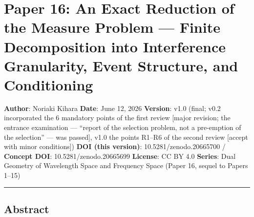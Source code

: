 \documentclass[
]{article}
\author{}
\date{}
\begin{document}
\section{Paper 16: An Exact Reduction of the Measure Problem --- Finite
Decomposition into Interference Granularity, Event Structure, and
Conditioning}\label{paper-16-an-exact-reduction-of-the-measure-problem-finite-decomposition-into-interference-granularity-event-structure-and-conditioning}

\textbf{Author}: Noriaki Kihara \textbf{Date}: June 12, 2026
\textbf{Version}: v1.0 (final; v0.2 incorporated the 6 mandatory points
of the first review {[}major revision; the entrance examination ---
``report of the selection problem, not a pre-emption of the selection''
--- was passed{]}, v1.0 the points R1--R6 of the second review {[}accept
with minor conditions{]}) \textbf{DOI (this version)}:
10.5281/zenodo.20665700 / \textbf{Concept DOI}: 10.5281/zenodo.20665699
\textbf{License}: CC BY 4.0 \textbf{Series}: Dual Geometry of Wavelength
Space and Frequency Space (Paper 16, sequel to Papers 1--15)

\begin{center}\rule{0.5\linewidth}{0.5pt}\end{center}

\subsection{Abstract}\label{abstract}
\end{document}
